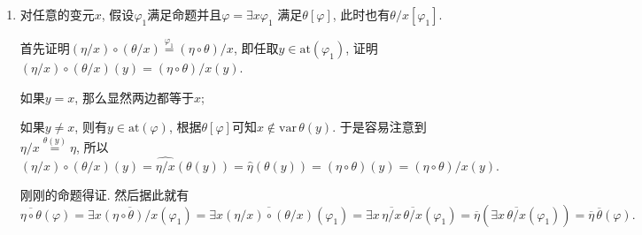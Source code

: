 \documentclass[UTF8]{ctexart}
\begin{document}
\begin{enumerate}
    \vspace{3pt}
    \item 对任意的变元$x$, 假设$\varphi_1$满足命题并且$\varphi=\exists x\varphi_1$
    满足$\theta[\varphi]$, 此时也有$\theta/x[\varphi_1]$.

    \vspace{3pt}\hspace{2.17em}
    首先证明$(\eta/x)\circ(\theta/x)\overset{\displaystyle\varphi_1}{=}
    (\eta\circ\theta)/x$, 即任取$y\in\mathrm{at}(\varphi_1)$,
    证明$(\eta/x)\circ(\theta/x)(y)=(\eta\circ\theta)/x(y)$.

    \vspace{3pt}\hspace{2.17em}
    如果$y=x$, 那么显然两边都等于$x$;
    
    \hspace{2.17em}
    如果$y\neq x$, 则有$y\in\mathrm{at}(\varphi)$,
    根据$\theta[\varphi]$可知$x\notin\mathrm{var}\,\theta(y)$. 于是容易注意到
    $\eta/x\overset{\displaystyle\theta(y)}{=}\eta$, 所以
    \vspace{3pt}
    \[
        (\eta/x)\circ(\theta/x)(y)=\widehat{\eta/x}(\theta(y))=
        \widehat{\eta}(\theta(y))=(\eta\circ\theta)(y)=(\eta\circ\theta)/x(y).
    \]

    \vspace{3pt}\hspace{2.17em}
    刚刚的命题得证. 然后据此就有
    \begin{equation*}
        \overline{\eta\circ\theta}(\varphi)=
        \exists x\overline{(\eta\circ\theta)/x}(\varphi_1)=
        \exists x\overline{(\eta/x)\circ(\theta/x)}(\varphi_1)=
        \exists x\,\overline{\eta/x}\,\overline{\theta/x}(\varphi_1)=
        \overline{\eta}\left(\exists x\,\overline{\theta/x}(\varphi_1)\right)=
        \overline{\eta}\,\overline{\theta}(\varphi).
    \tag*{\qedsymbol}\end{equation*}
\end{enumerate}



\end{document}
